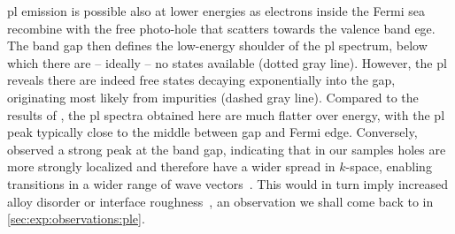 \Gls{pl} emission is possible also at lower energies as electrons inside the Fermi sea recombine with the free photo-hole that scatters towards the valence band ege.
The band gap then defines the low-energy shoulder of the \gls{pl} spectrum, below which there are -- ideally -- no states available (dotted gray line).
However, the \gls{pl} reveals there are indeed free states decaying exponentially into the gap, originating most likely from impurities (dashed gray line).
Compared to the results of \citet{Kamburov2017}, the \gls{pl} spectra obtained here are much flatter over energy, with the \gls{pl} peak typically close to the middle between gap and Fermi edge.
Conversely, \citet{Kamburov2017} observed a strong peak at the band gap,
indicating that in our samples holes are more strongly localized and therefore have a wider spread in $k$-space, enabling transitions in a wider range of wave vectors~\cite{Skolnick1987}.
This would in turn imply increased alloy disorder or interface roughness~\cite{Gabbay2008}, an observation we shall come back to in \cref{sec:exp:observations:ple}.

